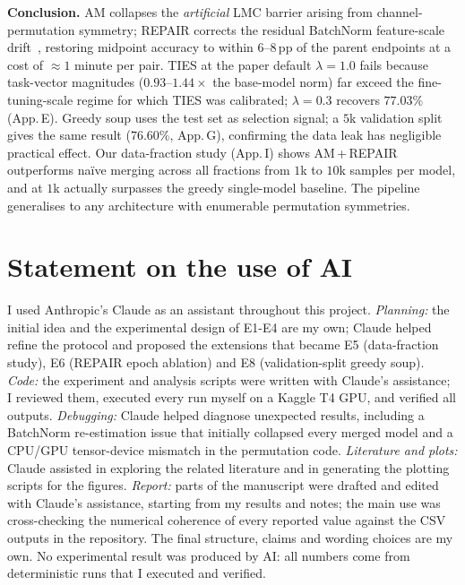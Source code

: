 \documentclass{article}
\begin{document}
\textbf{Conclusion.} AM collapses the \emph{artificial} LMC barrier arising from channel-permutation symmetry; REPAIR corrects the residual BatchNorm feature-scale drift~\citep{jordan2023repair}, restoring midpoint accuracy to within $6$--$8$\,pp of the parent endpoints at a cost of $\approx\!1$ minute per pair. TIES at the paper default $\lambda\!=\!1.0$ fails because task-vector magnitudes ($0.93$--$1.44\times$ the base-model norm) far exceed the fine-tuning-scale regime for which TIES was calibrated; $\lambda\!=\!0.3$ recovers $77.03\%$ (App.\,E). Greedy soup uses the test set as selection signal; a $5$k validation split gives the same result ($76.60\%$, App.\,G), confirming the data leak has negligible practical effect. Our data-fraction study (App.\,I) shows AM\,+\,REPAIR outperforms na\"ive merging across all fractions from $1$k to $10$k samples per model, and at $1$k actually surpasses the greedy single-model baseline. The pipeline generalises to any architecture with enumerable permutation symmetries.

\section{Statement on the use of AI}\label{sec:ai}
%
I used Anthropic's Claude as an
assistant throughout this project. \emph{Planning:} the initial idea and the
experimental design of E1-E4 are my own; Claude helped refine the protocol
and proposed the extensions that became E5 (data-fraction study), E6 (REPAIR
epoch ablation) and E8 (validation-split greedy soup). \emph{Code:} the
experiment and analysis scripts were written with Claude's assistance; I
reviewed them, executed every run myself on a Kaggle T4 GPU, and verified all
outputs. \emph{Debugging:} Claude helped diagnose unexpected results,
including a BatchNorm re-estimation issue that initially collapsed every
merged model and a CPU/GPU tensor-device mismatch in the permutation code.
\emph{Literature and plots:} Claude assisted in exploring the related
literature and in generating the plotting scripts for the figures.
\emph{Report:} parts of the manuscript were drafted and edited with Claude's
assistance, starting from my results and notes; the main use was
cross-checking the numerical coherence of every reported value against the
CSV outputs in the repository. The final structure, claims and wording
choices are my own. No experimental result was produced by AI: all numbers
come from deterministic runs that I executed and verified.
\end{document}
